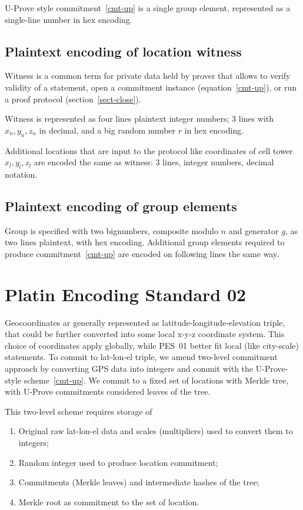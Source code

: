 \documentclass[a4paper,12pt]{article}
\begin{document}
U-Prove style commitment~\eqref{cmt-up}
is a single group element,
represented as a single-line number in hex encoding.

\subsection{Plaintext encoding of location witness}

Witness is a common term for private data held by prover
that allows to verify validity of a statement,
open a commitment instance (equation~\eqref{cmt-up}),
or run a proof protocol (section~\ref{sect-close}).

Witness is represented as four lines plaintext integer numbers;
3 lines with $x_n, y_n, z_n$ in decimal,
and a big random number $r$ in hex encoding.

Additional locations that are input to the protocol
like coordinates of cell tower $x_l, y_l, z_l$
are encoded the same as witness:
3 lines, integer numbers, decimal notation.

\subsection{Plaintext encoding of group elements}

Group is specified with two bignumbers,
composite modulo $n$ and generator $g$,
as two lines plaintext, with hex encoding.
Additional group elements required to produce commitment~\eqref{cmt-up}
are encoded on following lines the same way.


\section{Platin Encoding Standard 02}

Geocoordinates ar generally represented as latitude-longitude-elevation triple,
that could be further converted into some local x-y-z coordinate system.
This choice of coordinates apply globally,
while PES~01 better fit local (like city-scale) statements.
To commit to lat-lon-el triple, we amend two-level commitment approach
by converting GPS data into integers and
commit with the U-Prove-style scheme~\eqref{cmt-up}.
We commit to a fixed set of locations with Merkle tree,
with U-Prove commitments considered leaves of the tree.

This two-level scheme requires storage of
\begin{enumerate}
\item
  Original raw lat-lon-el data and
  scales (multipliers) used to convert them to integers;
\item
  Random integer used to produce location commitment;
\item
  Commitments (Merkle leaves) and intermediate hashes of the tree;
\item
  Merkle root as commitment to the set of location.
\end{enumerate}
\end{document}
